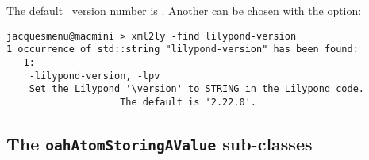 The default \lily\ version number is . Another can be chosen with the  option:
\begin{lstlisting}[language=Terminal]
jacquesmenu@macmini > xml2ly -find lilypond-version
1 occurrence of std::string "lilypond-version" has been found:
   1:
    -lilypond-version, -lpv
    Set the Lilypond '\version' to STRING in the Lilypond code.
                    The default is '2.22.0'.
\end{lstlisting}


\subsection{The {\tt oahAtomStoringAValue} sub-classes}

